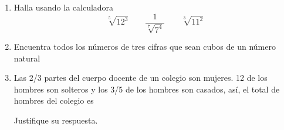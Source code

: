\documentclass[10pt,twoside]{article}
\begin{document}
\begin{enumerate}
\begin{enumerate}
  \end{enumerate}
  \item Halla usando la calculadora
  \[ \sqrt[5]{12^3}\qquad \dfrac{1}{\sqrt[7]{7^4}}\qquad \sqrt[3]{11^2} \]
  \item Encuentra todos los números de tres cifras que sean cubos de un número natural
  \item Las 2/3 partes del cuerpo docente de un colegio son mujeres. 12 de los hombres son solteros y los 3/5 de los hombres son casados, así, el total de hombres del colegio es
  \begin{enumerate}
  \end{enumerate}
  Justifique su respuesta.
\end{enumerate}
\end{document}
